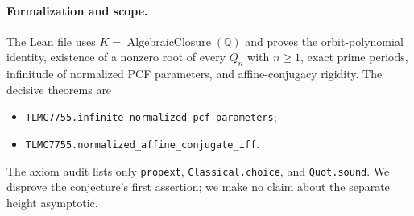 \documentclass[11pt]{article}
\begin{document}
\paragraph{Formalization and scope.}
The Lean file uses $K=\operatorname{AlgebraicClosure}(\mathbb Q)$ and proves
the orbit-polynomial identity, existence of a nonzero root of every $Q_n$
with $n\geq1$, exact prime periods, infinitude of normalized PCF
parameters, and affine-conjugacy rigidity. The decisive theorems are
\begin{itemize}
  \item \texttt{TLMC7755.infinite\_normalized\_pcf\_parameters};
  \item \texttt{TLMC7755.normalized\_affine\_conjugate\_iff}.
\end{itemize}
The axiom audit lists only \texttt{propext}, \texttt{Classical.choice}, and
\texttt{Quot.sound}.
We disprove the conjecture's first assertion; we make no claim about the
separate height asymptotic.
\end{document}

